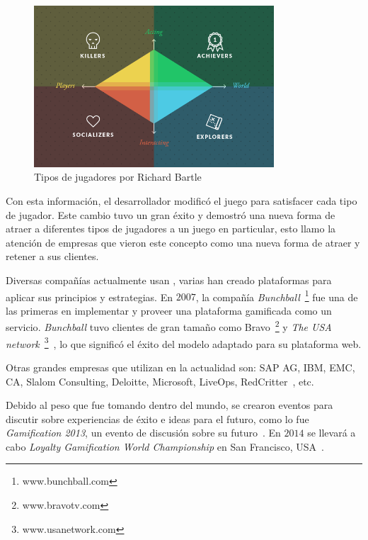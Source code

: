 \begin{figure}[!htb]
  \centering
  \includegraphics[width=0.8\textwidth]{images/TypeOfPlayersBartle.png}
  \caption[Tipos de esteriotipos de jugadores]{Tipos de jugadores por Richard Bartle}
  \label{fig:Players}
\end{figure}


Con esta información, el desarrollador modificó el juego para satisfacer cada
tipo de jugador.
Este cambio tuvo un gran éxito y demostró una nueva forma de atraer a diferentes
tipos de jugadores a un juego en particular, esto llamo la atención de empresas
que vieron este concepto como una nueva forma de atraer y retener a sus clientes.

Diversas compañías actualmente usan {\GAM}, varias han creado plataformas para
aplicar sus principios y estrategias.
En $2007$, la compañía \emph{Bunchball}~\footnote{www.bunchball.com} fue una de
las primeras en implementar y proveer una plataforma gamificada como un
servicio\cite{Gam:Bunchball:1}.
\emph{Bunchball} tuvo clientes de gran tamaño como Bravo~\footnote{www.bravotv.com}
y \emph{The USA network}~\footnote{www.usanetwork.com}~\cite{Gam:Bunchball:2},
lo que significó el éxito del modelo adaptado para su plataforma web.

Otras grandes empresas que utilizan {\GAM} en la actualidad son:
SAP AG, IBM, EMC, CA, Slalom Consulting, Deloitte, Microsoft, LiveOps,
RedCritter~\cite{Gam:Companies:1}, etc.

Debido al peso que {\GAM} fue tomando dentro del mundo,
se crearon eventos para discutir sobre experiencias de éxito e ideas para
el futuro, como lo fue \emph{Gamification 2013},
un evento de discusión sobre su futuro~\cite{Gam:Events:1}.
En $2014$ se llevará a cabo \emph{Loyalty Gamification World Championship}
en San Francisco, USA~\cite{Gam:Events:2}.

